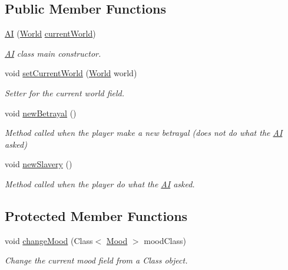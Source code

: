 \subsection*{Public Member Functions}
\begin{DoxyCompactItemize}
\item 
\hyperlink{classgameplay_1_1ai_1_1_a_i_afbee4fe418889d96a38c9874a36e901d}{A\-I} (\hyperlink{classworld_1_1_world}{World} \hyperlink{classgameplay_1_1ai_1_1_a_i_ae4344290e04c468cdd631fc367f4f885}{current\-World})
\begin{DoxyCompactList}\small\item\em \hyperlink{classgameplay_1_1ai_1_1_a_i}{A\-I} class main constructor. \end{DoxyCompactList}\item 
void \hyperlink{classgameplay_1_1ai_1_1_a_i_a0e329d9bc649c02f73422c285e9e4e15}{set\-Current\-World} (\hyperlink{classworld_1_1_world}{World} world)
\begin{DoxyCompactList}\small\item\em Setter for the current world field. \end{DoxyCompactList}\item 
void \hyperlink{classgameplay_1_1ai_1_1_a_i_ade34cf6dd9b6f1c6ebceccf040fffeb4}{new\-Betrayal} ()
\begin{DoxyCompactList}\small\item\em Method called when the player make a new betrayal (does not do what the \hyperlink{classgameplay_1_1ai_1_1_a_i}{A\-I} asked) \end{DoxyCompactList}\item 
void \hyperlink{classgameplay_1_1ai_1_1_a_i_ae37c568fcf8ccf9596665b94cb9c4702}{new\-Slavery} ()
\begin{DoxyCompactList}\small\item\em Method called when the player do what the \hyperlink{classgameplay_1_1ai_1_1_a_i}{A\-I} asked. \end{DoxyCompactList}\end{DoxyCompactItemize}
\subsection*{Protected Member Functions}
\begin{DoxyCompactItemize}
\item 
void \hyperlink{classgameplay_1_1ai_1_1_a_i_adbb46250627224cb4cd42ad99eaf42ba}{change\-Mood} (Class$<$ \hyperlink{classgameplay_1_1ai_1_1mood_1_1_mood}{Mood} $>$ mood\-Class)
\begin{DoxyCompactList}\small\item\em Change the current mood field from a Class object. \end{DoxyCompactList}\end{DoxyCompactItemize}
